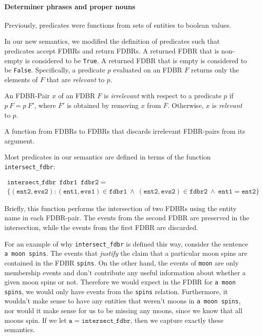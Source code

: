 \documentclass[../main.tex]{subfiles}
\begin{document}
\paragraph{Determiner phrases and proper nouns}
Previously, predicates were functions from sets of entities to boolean values.

In our new semantics, we modified the definition of predicates such that predicates accept FDBRs and return FDBRs.
A returned FDBR that is non-empty is considered to be \texttt{True}.  A returned FDBR that is empty is considered to be \texttt{False}.
Specifically, a predicate $p$ evaluated on an FDBR $F$ returns only the elements of $F$ that are {\em relevant} to $p$.

\begin{definition}
	An FDBR-Pair $x$ of an FDBR $F$ is {\em irrelevant} with respect to a predicate $p$ if $p\ F = p\ F'$, where $F'$ is obtained by removing $x$ from $F$.  Otherwise,
	$x$ is {\em relevant} to $p$.
\end{definition}

\begin{definition}[Predicate]
	A function from FDBRs to FDBRs that discards irrelevant FDBR-pairs from its argument.
\end{definition}

Most predicates in our semantics are defined in terms of the function \texttt{intersect\_fdbr}:

\begin{definition}
	\begin{multline*}
	\mathtt{intersect\_fdbr}\enspace \mathtt{fdbr1}\enspace \mathtt{fdbr2} = \\ \{\mathtt{(ent2, evs2) : (ent1, evs1) }\in \mathtt{fdbr1 \ \wedge\ (ent2, evs2) } \in \mathtt{fdbr2\ \wedge\ ent1 = ent2}\}
	\end{multline*}
\end{definition}

Briefly, this function performs the intersection of two FDBRs using the entity name in each FDBR-pair.  The events from the second FDBR are preserved
in the intersection, while the events from the first FDBR are discarded.

For an example of why \texttt{intersect\_fdbr} is defined this way, consider the sentence
\texttt{a moon spins}.  The events that {\em justify} the claim that a particular moon spins are contained in the FDBR \texttt{spins}.  On the other hand, the events of \texttt{moon}
are only membership events and don't contribute any useful information about whether a given moon spins or not.  Therefore we would expect in the FDBR for \texttt{a moon spins},
we would only have events from the \texttt{spins} relation.  Furthermore, it wouldn't make sense to have any entities that weren't moons in \texttt{a moon spins}, nor would
it make sense for us to be missing any moons, since we know that all moons spin.  If we let $\mathtt{a} = \mathtt{intersect\_fdbr}$, then we capture exactly these semantics.
\end{document}
